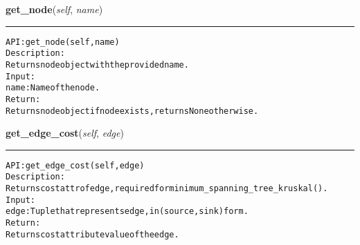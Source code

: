     \label{coinor:gimpy:graph:Graph:get_node}

    \vspace{0.5ex}

\hspace{.8\funcindent}\begin{boxedminipage}{\funcwidth}

    \raggedright \textbf{get\_node}(\textit{self}, \textit{name})

    \vspace{-1.5ex}

    \rule{\textwidth}{0.5\fboxrule}
\setlength{\parskip}{2ex}
\begin{alltt}

API: get\_node(self, name)
Description:
Returns node object with the provided name.
Input:
    name: Name of the node.
Return:
    Returns node object if node exists, returns None otherwise.
\end{alltt}

\setlength{\parskip}{1ex}
    \end{boxedminipage}

    \label{coinor:gimpy:graph:Graph:get_edge_cost}

    \vspace{0.5ex}

\hspace{.8\funcindent}\begin{boxedminipage}{\funcwidth}

    \raggedright \textbf{get\_edge\_cost}(\textit{self}, \textit{edge})

    \vspace{-1.5ex}

    \rule{\textwidth}{0.5\fboxrule}
\setlength{\parskip}{2ex}
\begin{alltt}

API: get\_edge\_cost(self, edge)
Description:
Returns cost attr of edge, required for minimum\_spanning\_tree\_kruskal().
Input:
    edge: Tuple that represents edge, in (source,sink) form.
Return:
    Returns cost attribute value of the edge.
\end{alltt}

\setlength{\parskip}{1ex}
    \end{boxedminipage}

